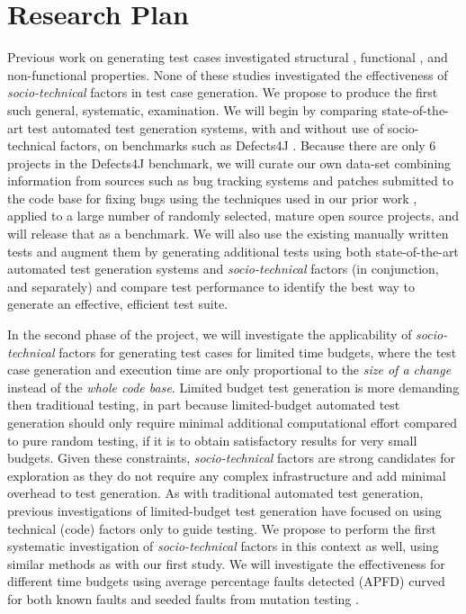 \documentclass[10pt]{article}
\begin{document}
\section{Research Plan}

 Previous work on generating test cases investigated structural \cite{tonella2004evolutionary}, functional \cite{wegener2004evaluation}, and non-functional \cite{wegener1998verifying} properties. %
None of these studies investigated the effectiveness of \emph{socio-technical} factors in test case generation. We propose to produce the first such general, systematic, examination. We will begin by comparing state-of-the-art test automated test generation systems, with and without use of socio-technical factors, on benchmarks such as Defects4J \cite{just2014defects4j}.  Because there are only 6 projects in the Defects4J benchmark, we will curate our own data-set combining information from  sources such as bug tracking systems and patches submitted to the code base for fixing bugs using the techniques used in our prior work \cite{ahmed2016can}, applied to a large number of randomly selected, mature open source projects, and will release that as a benchmark.  We will also use the existing manually written tests and augment them by generating additional tests using both state-of-the-art automated test generation systems and \emph{socio-technical} factors (in conjunction, and separately) and compare test performance to identify the best way to generate an effective, efficient test suite.

 In the second phase of the project, we will investigate the applicability of \emph{socio-technical} factors for generating test cases for limited time budgets, where the test case generation and execution time are only proportional to the \emph{size of a change} instead of the \emph{whole code base}. Limited budget test generation is more demanding then traditional testing, in part because limited-budget automated test generation should only require minimal additional computational effort compared to pure random testing, if it is to obtain satisfactory results for very small budgets. Given these constraints, \emph{socio-technical} factors are strong candidates for exploration as they do not require any complex infrastructure and add minimal overhead to test generation.  As with traditional automated test generation, previous investigations of limited-budget test generation \cite{groce2012lightweight} have focused on using technical (code) factors only to guide testing. We propose to perform the first systematic investigation of \emph{socio-technical} factors in this context as well, using similar methods as with our first study.  
We will investigate the effectiveness for different time budgets using average percentage faults detected (APFD) \cite{elbaum2002test} curved for both known faults and seeded faults from mutation testing \cite{ahmed2017applying}.
\end{document}
